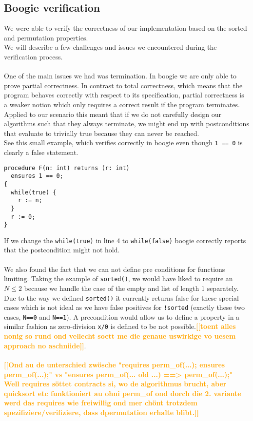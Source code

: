 \documentclass{report}
\newcommand{\todo}[1]{\textsf{\textbf{\textcolor{orange}{[[#1]]}}}}
\begin{document}
\subsection{Boogie verification}
\label{s:boogie_verification}
We were able to verify the correctness of our implementation based on the sorted and permutation properties.\\
We will describe a few challenges and issues we encountered during the verification process.
\\\\
One of the main issues we had was termination. In boogie we are only able to prove partial correctness. In contrast to total correctness, which means that the program behaves correctly with respect to its specification, partial correctness is a weaker notion which only requires a correct result if the program terminates.\\
Applied to our scenario this meant that if we do not carefully design our algorithms such that they always terminate, we might end up with postconditions that evaluate to trivially true because they can never be reached.\\
See this small example, which verifies correctly in boogie even though \texttt{1 == 0} is clearly a false statement.
\begin{lstlisting}
procedure F(n: int) returns (r: int)
  ensures 1 == 0;
{
  while(true) {
    r := n;
  }
  r := 0;
}
\end{lstlisting}
If we change the \texttt{while(true)} in line 4 to \texttt{while(false)} boogie correctly reports that the postcondition might not hold.
\\\\
We also found the fact that we can not define pre conditions for functions limiting. Taking the example of \texttt{sorted()}, we would have liked to require an $N \leq 2$ because we handle the case of the empty and list of length 1 separately. Due to the way we defined \texttt{sorted()} it currently returns false for these special cases which is not ideal as we have false positives for \texttt{!sorted} (exactly these two cases, \texttt{N==0} and \texttt{N==1}). A precondition would allow us to define a property in a similar fashion as zero-division \texttt{x/0} is defined to be not possible.\todo{toent alles nonig so rund ond vellecht soett me die genaue uswirkige vo uesem approach no aschniide}.
\\\\
\todo{Ond au de unterschied zwösche "requires perm\_of(...); ensures perm\_of(...);" vs "ensures perm\_of(... old  ...) ==> perm\_of(...);"
Well requires söttet contracts si, wo de algorithmus brucht, aber quicksort etc funktioniert au ohni perm\_of ond dorch die 2. variante werd das requires wie freiwillig ond mer chönt trotzdem spezifiziere/verifiziere, dass dpermutation erhalte blibt.}
\end{document}
